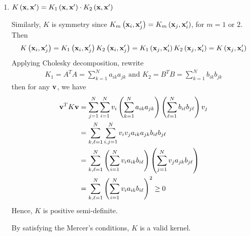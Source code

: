 \documentclass[12pt]{article}
\newcommand{\ParTh}[1]{\left(#1\right)}
\newcommand{\BF}[1]{{\bf#1}}
\begin{document}
\begin{enumerate}
	\item $K\ParTh{\BF{x},\BF{x}^\prime}=K_1\ParTh{\BF{x},\BF{x}^\prime}\cdot K_2\ParTh{\BF{x},\BF{x}^\prime}$
	
	Similarly, $K$ is symmetry since $K_m\ParTh{\BF{x}_i,\BF{x}^\prime_j}=K_m\ParTh{\BF{x}_j,\BF{x}^\prime_i}$, for $m=1\text{ or }2$. Then
	\begin{align}
	K\ParTh{\BF{x}_i,\BF{x}^\prime_j}=K_1\ParTh{\BF{x}_i,\BF{x}^\prime_j}K_2\ParTh{\BF{x}_i,\BF{x}^\prime_j}=K_1\ParTh{\BF{x}_j,\BF{x}^\prime_i}K_2\ParTh{\BF{x}_j,\BF{x}^\prime_i}=K\ParTh{\BF{x}_j,\BF{x}^\prime_i}
	\end{align}
	Applying Cholesky decomposition, rewrite
	\begin{align}
	K_1=A^TA=\sum_{k=1}^{N}a_{ik}a_{jk}\text{ and }K_2=B^TB=\sum_{k=1}^{N}b_{ik}b_{jk}
	\end{align}
	then for any $\BF{v}$, we have
	\begin{align}
	\BF{v}^TK\BF{v}&=\sum_{j=1}^{N}\sum_{i=1}^{N}v_i\ParTh{\sum_{k=1}^{N}a_{ik}a_{jk}}\ParTh{\sum_{\ell=1}^{N}b_{i\ell}b_{j\ell}}v_j\\
	&=\sum_{k,\ell=1}^{N}\sum_{i,j=1}^{N}v_iv_ja_{ik}a_{jk}b_{i\ell}b_{j\ell}\\
	&=\sum_{k,\ell=1}^{N}\ParTh{\sum_{i=1}^{N}v_ia_{ik}b_{i\ell}}\ParTh{\sum_{j=1}^{N}v_ja_{jk}b_{j\ell}}\\
	&=\sum_{k,\ell=1}^{N}\ParTh{\sum_{i=1}^{N}v_ia_{ik}b_{i\ell}}^2\geq0
	\end{align}
	Hence, $K$ is positive semi-definite.
	
	By satisfying the Mercer's conditions, $K$ is a valid kernel.

\end{enumerate}
\end{document}
